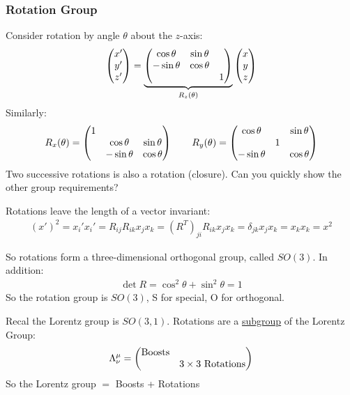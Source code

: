 \subsubsection{Rotation Group}
Consider rotation by angle $\theta$ about the $z$-axis:
\begin{align*}
  \pmqty{x'\\y'\\z'}=
  \underbrace{\pmqty{\cos\theta & \sin\theta&\\
      -\sin\theta&\cos\theta&\\&&1}}_{R_z(\theta)}
  \pmqty{x\\y\\z}
\end{align*}
Similarly:
\begin{align*}
  R_x(\theta)=
  \pmqty{1\\&\cos\theta&\sin\theta\\&-\sin\theta&\cos\theta}
  \qquad
  R_y(\theta)=
  \pmqty{\cos\theta&&\sin\theta\\&1&\\-\sin\theta&&\cos\theta}
\end{align*}
Two successive rotations is also a rotation (closure). Can you quickly show the other group requirements?

Rotations leave the length of a vector invariant:
\begin{align*}
  (x')^2=x_i'x_i'=R_{ij}R_{ik}x_jx_k=(R^T)_{ji}R_{ik}x_jx_k=\delta_{jk}x_jx_k
  =x_kx_k=x^2
\end{align*}

So rotations form a three-dimensional orthogonal group, called $SO(3)$. In addition:
\begin{align*}
  \det{R}=\cos^2\theta+\sin^2\theta=1
\end{align*}
So the rotation group is $SO(3)$, S for special, O for orthogonal.

Recal the Lorentz group is $SO(3,1)$. Rotations are a \underline{subgroup} of the Lorentz Group:
\begin{align*}
  \Lambda^\mu_\nu=\pmqty{\text{Boosts}&\\&3\times3\text{ Rotations}}
\end{align*}
So the Lorentz group $=$ Boosts + Rotations


